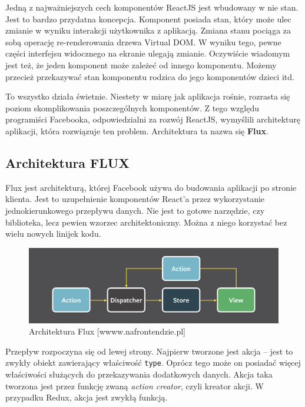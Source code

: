 Jedną z najważniejszych cech komponentów ReactJS jest wbudowany w nie stan.
Jest to bardzo przydatna koncepcja. Komponent posiada stan,
który może ulec zmianie w wyniku interakcji użytkownika z aplikacją.
Zmiana stanu pociąga za sobą operację re-renderowania drzewa Virtual DOM.
W wyniku tego, pewne części interfejsu widocznego na ekranie ulegają zmianie.
Oczywiście wiadomym jest też, że jeden komponent może zależeć od innego komponentu.
Możemy przecież przekazywać stan komponentu rodzica do jego komponentów dzieci itd.

To wszystko działa świetnie. Niestety w miarę jak aplikacja rośnie,
rozrasta się poziom skomplikowania poszczególnych komponentów.
Z tego względu programiści Facebooka, odpowiedzialni za rozwój ReactJS, wymyślili
architekturę aplikacji, która rozwiązuje ten problem.
Architektura ta nazwa się \textbf{Flux}.
\cite{www_nafrontendzie}

\subsection{Architektura FLUX}

Flux jest architekturą, której Facebook używa do budowania aplikacji po stronie klienta.
Jest to uzupełnienie komponentów React’a przez wykorzystanie jednokierunkowego przepływu danych.
Nie jest to gotowe narzędzie, czy biblioteka, lecz pewien wzorzec architektoniczny.
Można z niego korzystać bez wielu nowych linijek kodu.

\begin{figure}[H]
	\centering\includegraphics[width=.7\textwidth]{img/flux}
	\caption{Architektura Flux [wwww.nafrontendzie.pl]}\label{rys:flux}%
\end{figure}

Przepływ rozpoczyna się od lewej strony.
Najpierw tworzone jest akcja – jest to zwykły obiekt zawierający właściwość \texttt{type}.
Oprócz tego może on posiadać więcej właściwości służących do przekazywania dodatkowych danych.
Akcja taka tworzona jest przez funkcję zwaną \textit{action creator}, czyli kreator akcji.
W przypadku Redux, akcja jest zwykłą funkcją.

